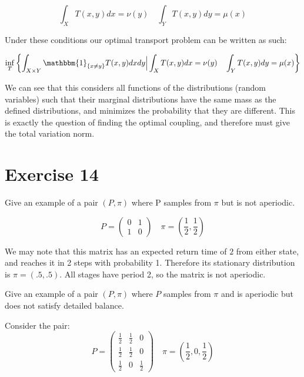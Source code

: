 \documentclass[12pt]{paper}
\newcommand{\indicate}[1]{ \mathbbm{1}_{\{#1\}}}
\begin{document}
\begin{equation*}
  \int_XT(x,y)dx = \nu(y) \quad \int_Y T(x,y)dy = \mu(x)
\end{equation*}

Under these conditions our optimal transport problem can be written as
such:

\begin{equation*}
  \inf_T \left\{ \int_{X \times Y} \indicate{x \neq y}T(x,y)dxdy \Big\vert \int_XT(x,y)dx = \nu(y) \quad \int_Y T(x,y)dy = \mu(x) \right\}
\end{equation*}

We can see that this considers all functions of the distributions
(random variables) such that their marginal distributions have the
same mass as the defined distributions, and minimizes the probability
that they are different. This is exactly the question of finding the
optimal coupling, and therefore must give the total variation norm.


\section{Exercise 14}
Give an example of a pair $(P,\pi)$ where P samples from $\pi$ but is not
aperiodic.

\vspace{.3in}

\begin{equation*}
  P =
  \begin{pmatrix}
    0 & 1\\
    1 & 0
  \end{pmatrix} \quad \pi = \left(\frac{1}{2}, \frac{1}{2}\right)
\end{equation*}

We may note that this matrix has an expected return time of $2$ from
either state, and reaches it in 2 steps with probability 1. Therefore
its stationary distribution is $\pi = (.5, .5)$. All stages have period
2, so the matrix is not aperiodic.

\vspace{.3in}

Give an example of a pair $(P,\pi)$ where $P$ samples from $\pi$ and is
aperiodic but does not satisfy detailed balance.

\vspace{.3in}

Consider the pair:
\begin{equation*}
  P =
  \begin{pmatrix}
    \frac{1}{2} & \frac{1}{2} & 0\\
    \frac{1}{2} & \frac{1}{2} & 0\\
    \frac{1}{2} & 0 & \frac{1}{2}
  \end{pmatrix}
  \quad \pi = \left(\frac{1}{2}, 0, \frac{1}{2}\right)
\end{equation*}
\end{document}
